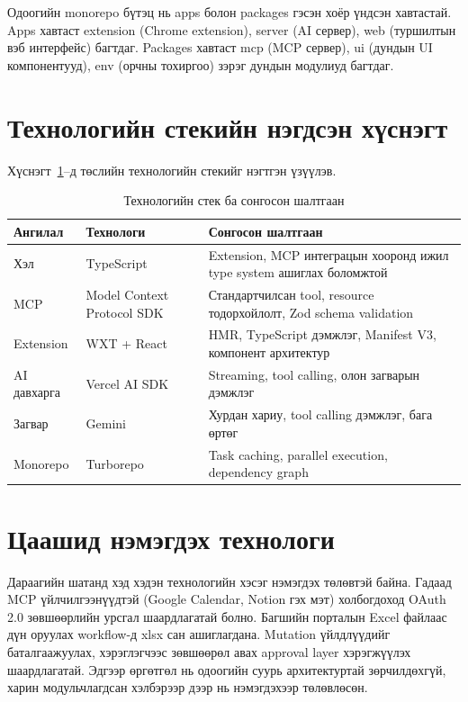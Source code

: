Одоогийн monorepo бүтэц нь apps болон packages гэсэн хоёр үндсэн хавтастай. Apps хавтаст extension (Chrome extension), server (AI сервер), web (туршилтын вэб интерфейс) багтдаг. Packages хавтаст mcp (MCP сервер), ui (дундын UI компонентууд), env (орчны тохиргоо) зэрэг дундын модулиуд багтдаг.

\section{Технологийн стекийн нэгдсэн хүснэгт}

Хүснэгт~\ref{tab:stack}--д төслийн технологийн стекийг нэгтгэн үзүүлэв.

\begin{table}[H]
  \centering
  \caption{Технологийн стек ба сонгосон шалтгаан}
  \label{tab:stack}
  \begin{tabularx}{\textwidth}{>{\raggedright\arraybackslash}p{3.3cm} >{\raggedright\arraybackslash}p{3.2cm} X}
    \toprule
    Ангилал & Технологи & Сонгосон шалтгаан \\
    \midrule
    Хэл & TypeScript & Extension, MCP интеграцын хооронд ижил type system ашиглах боломжтой \\
    MCP & Model Context Protocol SDK & Стандартчилсан tool, resource тодорхойлолт, Zod schema validation \\
    Extension & WXT + React & HMR, TypeScript дэмжлэг, Manifest V3, компонент архитектур \\
    AI давхарга & Vercel AI SDK & Streaming, tool calling, олон загварын дэмжлэг \\
    Загвар & Gemini & Хурдан хариу, tool calling дэмжлэг, бага өртөг \\
    Monorepo & Turborepo & Task caching, parallel execution, dependency graph \\
    \bottomrule
  \end{tabularx}
\end{table}

\section{Цаашид нэмэгдэх технологи}

Дараагийн шатанд хэд хэдэн технологийн хэсэг нэмэгдэх төлөвтэй байна. Гадаад MCP үйлчилгээнүүдтэй (Google Calendar, Notion гэх мэт) холбогдоход OAuth 2.0 зөвшөөрлийн урсгал шаардлагатай болно. Багшийн порталын Excel файлаас дүн оруулах workflow-д xlsx сан ашиглагдана. Mutation үйлдлүүдийг баталгаажуулах, хэрэглэгчээс зөвшөөрөл авах approval layer хэрэгжүүлэх шаардлагатай. Эдгээр өргөтгөл нь одоогийн суурь архитектуртай зөрчилдөхгүй, харин модульчлагдсан хэлбэрээр дээр нь нэмэгдэхээр төлөвлөсөн.
